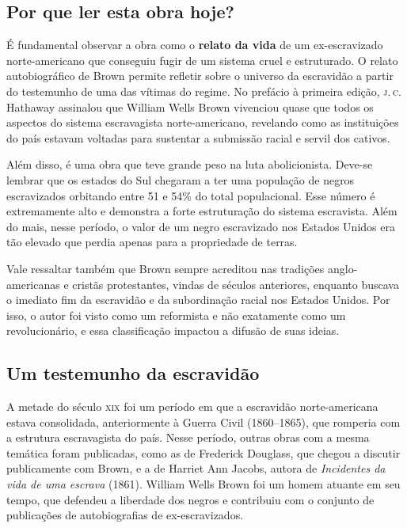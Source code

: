 \documentclass[12pt]{extarticle}
\begin{document}
\subsection{Por que ler esta obra hoje?}


É fundamental observar a obra como o \textbf{relato da vida} de um
ex-escravizado norte-americano que conseguiu fugir de um sistema 
cruel e estruturado. O relato autobiográfico de Brown permite
refletir sobre o universo da escravidão a partir do testemunho de uma
das vítimas do regime. No prefácio à primeira edição, \textsc{j.\,c.} Hathaway
assinalou que William Wells Brown vivenciou quase que todos os aspectos
do sistema escravagista norte-americano, revelando como as
instituições do país estavam voltadas para sustentar a submissão racial
e servil dos cativos.

Além disso, é uma obra que teve grande peso na luta abolicionista.
Deve-se lembrar que os estados do Sul chegaram a ter uma população de
negros escravizados orbitando entre 51 e 54\% do total populacional.
Esse número é extremamente alto e demonstra a forte estruturação do
sistema escravista. Além do mais, nesse período, o valor de um negro
escravizado nos Estados Unidos era tão elevado que perdia apenas para a
propriedade de terras.

Vale ressaltar também que Brown sempre acreditou nas tradições
anglo-americanas e cristãs protestantes, vindas de séculos anteriores,
enquanto buscava o imediato fim da escravidão e da subordinação racial
nos Estados Unidos. Por isso, o autor foi visto como um reformista e não
exatamente como um revolucionário, e essa classificação impactou a
difusão de suas ideias.

\subsection{Um testemunho da escravidão}

A metade do século \textsc{xix} foi um período em que a escravidão
norte-americana estava consolidada, anteriormente à Guerra Civil
(1860--1865), que romperia com a estrutura escravagista do país. Nesse
período, outras obras com a mesma temática foram publicadas, como as de
Frederick Douglass, que chegou a discutir publicamente com Brown, e
a de Harriet Ann Jacobs, autora de \emph{Incidentes da vida de uma escrava}
(1861). William Wells Brown foi um homem
atuante em seu tempo, que defendeu a liberdade dos negros e contribuiu
com o conjunto de publicações de autobiografias de ex-escravizados.
\end{document}
